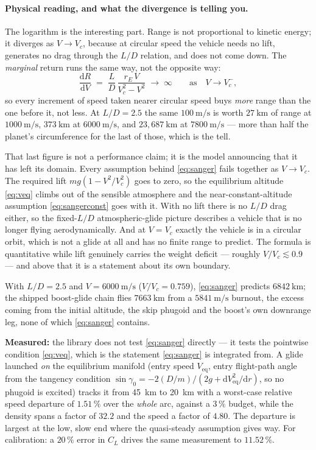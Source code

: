 \documentclass[11pt]{article}
\newcommand{\dd}{\mathrm{d}}
\begin{document}
\paragraph{Physical reading, and what the divergence is telling you.}
The logarithm is the interesting part. Range is not proportional to kinetic
energy; it diverges as $V\to V_c$, because at circular speed the vehicle needs
no lift, generates no drag through the $L/D$ relation, and does not come down.
The \emph{marginal} return runs the same way, not the opposite way:
\begin{equation}
  \frac{\dd R}{\dd V} \;=\; \frac{L}{D}\,\frac{r_E\,V}{V_c^2 - V^2}
  \;\longrightarrow\; \infty \qquad\text{as}\quad V\to V_c^{-} ,
  \label{eq:dRdV}
\end{equation}
so every increment of speed taken nearer circular speed buys \emph{more} range
than the one before it, not less. At $L/D=2.5$ the same $100~\mathrm{m/s}$ is
worth $27~\mathrm{km}$ of range at $1000~\mathrm{m/s}$, $373~\mathrm{km}$ at
$6000~\mathrm{m/s}$, and $23{,}687~\mathrm{km}$ at $7800~\mathrm{m/s}$ --- more
than half the planet's circumference for the last of those, which is the tell.

That last figure is not a performance claim; it is the model announcing that it
has left its domain. Every assumption behind \eqref{eq:sanger} fails together
as $V\to V_c$. The required lift $mg(1-V^2/V_c^2)$ goes to zero, so the
equilibrium altitude \eqref{eq:veq} climbs out of the sensible atmosphere and
the near-constant-altitude assumption \eqref{eq:sangerconst} goes with it. With
no lift there is no $L/D$ drag either, so the fixed-$L/D$ atmospheric-glide
picture describes a vehicle that is no longer flying aerodynamically. And at
$V = V_c$ exactly the vehicle is in a circular orbit, which is not a glide at
all and has no finite range to predict. The formula is quantitative while lift
genuinely carries the weight deficit --- roughly $V/V_c \lesssim 0.9$ --- and
above that it is a statement about its own boundary.

With $L/D = 2.5$ and $V = 6000~\mathrm{m/s}$
($V/V_c = 0.759$), \eqref{eq:sanger} predicts $6842~\mathrm{km}$;
the shipped boost-glide chain flies $7663~\mathrm{km}$ from a
$5841~\mathrm{m/s}$ burnout, the excess coming from the initial altitude, the
skip phugoid and the boost's own downrange leg, none of which
\eqref{eq:sanger} contains.

\textbf{Measured:} the library does not test \eqref{eq:sanger} directly ---
it tests the pointwise condition \eqref{eq:veq}, which is the statement
\eqref{eq:sanger} is integrated from. A glide launched \emph{on} the
equilibrium manifold (entry speed $V_{\text{eq}}$, entry flight-path angle from
the tangency condition
$\sin\gamma_0 = -2(D/m)/(2g + \dd V_{\text{eq}}^2/\dd r)$, so no phugoid is
excited) tracks it from 45~km to 20~km with a worst-case relative speed
departure of $\mathbf{1.51\,\%}$ over the \emph{whole} arc, against a $3\,\%$
budget, while the density spans a factor of $32.2$ and the speed a factor of
$4.80$. The departure is largest at the low, slow end where the quasi-steady
assumption gives way. For calibration: a $20\,\%$ error in $C_L$ drives the
same measurement to $11.52\,\%$.
\end{document}
